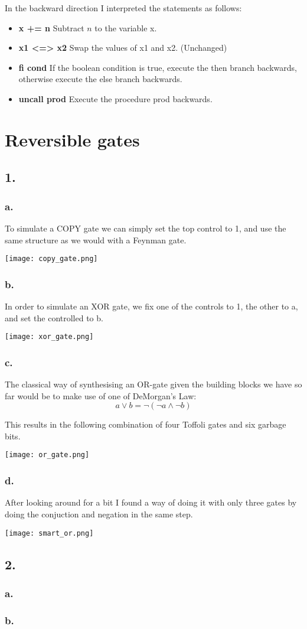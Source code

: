 \documentclass[12pt]{report}
\begin{document}
In the backward direction I interpreted the statements as follows:
\begin{itemize}
\item \textbf{ x += n } Subtract $n$ to the variable x.
\item \textbf{ x1 <=> x2 } Swap the values of x1 and x2. (Unchanged)
\item \textbf{ fi cond } If the boolean condition is true, execute the then branch backwards, otherwise execute the else branch backwards.
\item \textbf{ uncall prod } Execute the procedure prod backwards.
\end{itemize}

\section*{Reversible gates}
\subsection*{1.}
  \subsubsection*{a.}
    To simulate a COPY gate we can simply set the top control to 1, and use the same structure as we would with a Feynman gate.

    \texttt{[image: copy\_gate.png]}
  \subsubsection*{b.}
    In order to simulate an XOR gate, we fix one of the controls to 1, the other to a, and set the controlled to b.

    \texttt{[image: xor\_gate.png]}
  \subsubsection*{c.}
    The classical way of synthesising an OR-gate given the building blocks we have so far would be to make use of one of DeMorgan's Law:
    $$ a \lor b = \neg ( \neg a \land \neg b) $$

    This results in the following combination of four Toffoli gates and six garbage bits.

    \texttt{[image: or\_gate.png]}

  \subsubsection*{d.}
    After looking around for a bit I found a way of doing it with only three gates by doing the conjuction and negation in the same step.

    \texttt{[image: smart\_or.png]}

\subsection*{2.}
  \subsubsection*{a.}
    

  \subsubsection*{b.}
\end{document}
